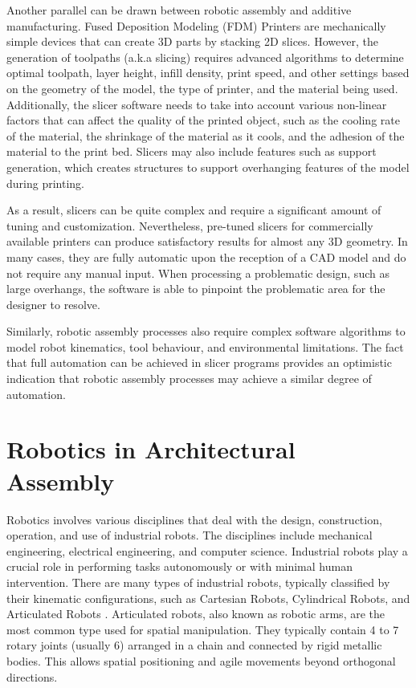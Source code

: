 Another parallel can be drawn between robotic assembly and additive manufacturing. Fused Deposition Modeling (FDM) Printers are mechanically simple devices that can create 3D parts by stacking 2D slices. However, the generation of toolpaths (a.k.a slicing) requires advanced algorithms to determine optimal toolpath, layer height, infill density, print speed, and other settings based on the geometry of the model, the type of printer, and the material being used. Additionally, the slicer software needs to take into account various non-linear factors that can affect the quality of the printed object, such as the cooling rate of the material, the shrinkage of the material as it cools, and the adhesion of the material to the print bed. Slicers may also include features such as support generation, which creates structures to support overhanging features of the model during printing. 

As a result, slicers can be quite complex and require a significant amount of tuning and customization. Nevertheless, pre-tuned slicers for commercially available printers can produce satisfactory results for almost any 3D geometry. In many cases, they are fully automatic upon the reception of a CAD model and do not require any manual input. When processing a problematic design, such as large overhangs, the software is able to pinpoint the problematic area for the designer to resolve. 

Similarly, robotic assembly processes also require complex software algorithms to model robot kinematics, tool behaviour, and environmental limitations. The fact that full automation can be achieved in slicer programs provides an optimistic indication that robotic assembly processes may achieve a similar degree of automation.

\section{Robotics in Architectural Assembly}
\label{section:introduction_robotics_in_architectural_assembly}

Robotics involves various disciplines that deal with the design, construction, operation, and use of industrial robots. The disciplines include mechanical engineering, electrical engineering, and computer science. Industrial robots play a crucial role in performing tasks autonomously or with minimal human intervention. There are many types of industrial robots, typically classified by their kinematic configurations, such as Cartesian Robots, Cylindrical Robots, and Articulated Robots \parencite{waldronKinematics2016}. Articulated robots, also known as robotic arms, are the most common type used for spatial manipulation. They typically contain 4 to 7 rotary joints (usually 6) arranged in a chain and connected by rigid metallic bodies. This allows spatial positioning and agile movements beyond orthogonal directions.

